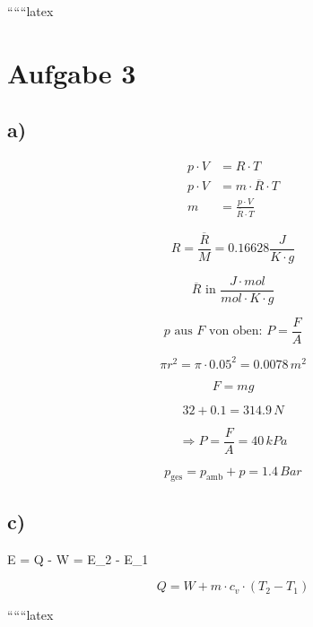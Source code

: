 
``````latex


\section*{Aufgabe 3}

\subsection*{a)}

\begin{align*}
p \cdot V &= R \cdot T \\
p \cdot V &= m \cdot \overline{R} \cdot T \\
m &= \frac{p \cdot V}{\overline{R} \cdot T}
\end{align*}

\[
R = \frac{\overline{R}}{M} = 0.16628 \frac{J}{K \cdot g}
\]

\[
\overline{R} \text{ in } \frac{J \cdot mol}{mol \cdot K \cdot g}
\]

\[
p \text{ aus } F \text{ von oben: } P = \frac{F}{A}
\]

\[
\pi r^2 = \pi \cdot 0.05^2 = 0.0078 \, m^2
\]

\[
F = mg
\]

\[
32 + 0.1 = 314.9 \, N
\]

\[
\Rightarrow P = \frac{F}{A} = 40 \, kPa
\]

\[
p_{\text{ges}} = p_{\text{amb}} + p = 1.4 \, Bar
\]

\subsection*{c)}

 \Delta E = Q - W = E_2 - E_1

\[
Q = W + m \cdot c_v \cdot (T_2 - T_1)
\]

``````latex


